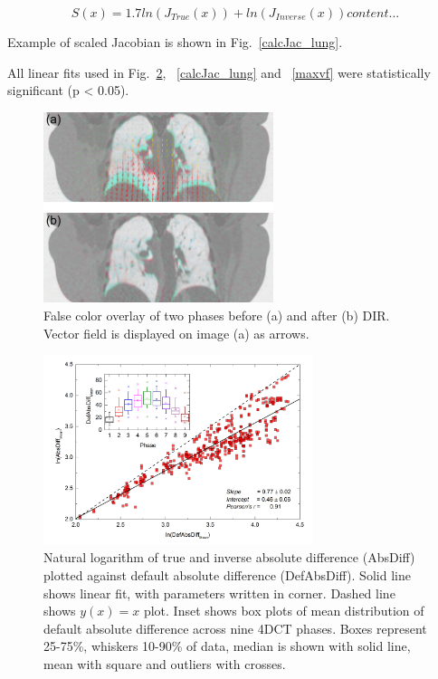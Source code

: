 \documentclass[type=dr, dr=rernat, accentcolor=tud7b,colorbacktitle, bigchapter, openright, twoside, 12pt ]{tudthesis}
\begin{document}
\begin{equation}
S(x) = 1.7 ln(J_{True}(x)) + ln(J_{Inverse}(x))
	content...
\end{equation}

Example of scaled Jacobian is shown in Fig.~\ref{calcJac_lung}.

All linear fits used in Fig.~\ref{absDiff_lung}, ~\ref{calcJac_lung} and ~\ref{maxvf} were statistically significant (p < 0.05).

\begin{figure}[H]
	\begin{center}		
		\includegraphics[width=0.6\textwidth]{./Images/exampleReg.png}
		\caption{False color overlay of two phases before (a) and after (b) DIR. Vector field is displayed on image (a) as arrows.}
		\label{exampleReg_lung}
	\end{center}
\end{figure}



\begin{figure}[H]
	\begin{center}		
		\includegraphics[width=0.7\textwidth]{./Images/absDiff.png}
		\caption{Natural logarithm of true and inverse absolute difference (AbsDiff) plotted against default absolute difference (DefAbsDiff). Solid line shows linear fit, with parameters
		written in corner. Dashed line shows $y(x)=x$ plot. Inset shows box plots of mean distribution of default absolute difference across nine 4DCT phases. Boxes represent 25-75\%, whiskers 10-90\%
		of data, median is shown with solid line, mean with square and outliers with crosses.}
		\label{absDiff_lung}
	\end{center}
\end{figure}
\end{document}
